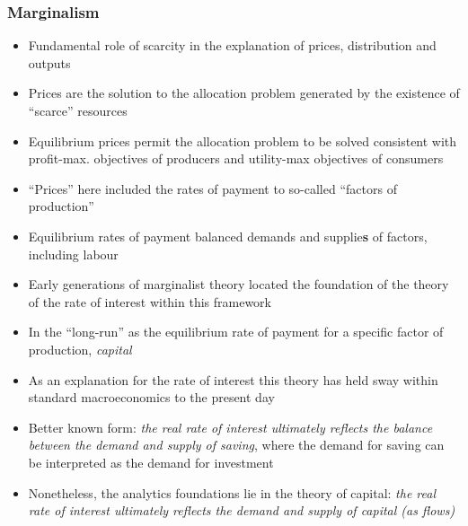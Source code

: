 \documentclass{article}
\begin{document}
	\subsubsection{Marginalism}
	\begin{itemize}
		\item Fundamental role of scarcity in the explanation of prices, distribution and outputs 
		\item Prices are the solution to the allocation problem generated by the existence of ``scarce'' resources
		\item Equilibrium prices permit the allocation problem to be solved consistent with profit-max. objectives of producers and utility-max objectives of consumers
		\item ``Prices'' here included the rates of payment to so-called ``factors of production''
		\item Equilibrium rates of payment balanced demands and supplie\textbf{s} of factors, including labour
		\item Early generations of marginalist theory located the foundation of the theory of the rate of interest within this framework
		\item In the ``long-run'' as the equilibrium rate of payment for a specific factor of production, \textit{capital}
		\item As an explanation for the rate of interest this theory has held sway within standard macroeconomics to the present day
		\item Better known form: \textit{the real rate of interest ultimately reflects the balance between the demand and supply of saving}, where the demand for saving can be interpreted as the demand for investment
		\item Nonetheless, the analytics foundations lie in the theory of capital: \textit{the real rate of interest ultimately reflects the demand and supply of capital (as flows)}
	\end{itemize}
\end{document}
